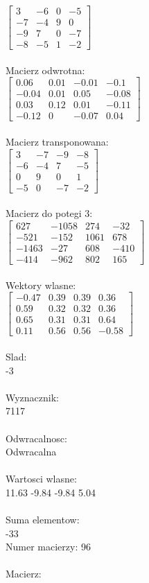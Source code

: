 \documentclass[a4paper,12pt]{article}
\begin{document}
$\begin{bmatrix} 3&-6&0&-5\\-7&-4&9&0\\-9&7&0&-7\\-8&-5&1&-2 \end{bmatrix}$
\\
\\
Macierz odwrotna:\\

$\begin{bmatrix} 0.06&0.01&-0.01&-0.1\\-0.04&0.01&0.05&-0.08\\0.03&0.12&0.01&-0.11\\-0.12&0&-0.07&0.04 \end{bmatrix}$
\\
\\
Macierz transponowana:\\

$\begin{bmatrix} 3&-7&-9&-8\\-6&-4&7&-5\\0&9&0&1\\-5&0&-7&-2 \end{bmatrix}$
\\
\\
Macierz do potegi 3:\\

$\begin{bmatrix} 627&-1058&274&-32\\-521&-152&1061&678\\-1463&-27&608&-410\\-414&-962&802&165 \end{bmatrix}$
\\
\\
Wektory wlasne:\\

$\begin{bmatrix} -0.47&0.39&0.39&0.36\\0.59&0.32&0.32&0.36\\0.65&0.31&0.31&0.64\\0.11&0.56&0.56&-0.58 \end{bmatrix}$
\\
\\
Slad:\\
-3
\\
\\
Wyznacznik:\\
7117
\\
\\
Odwracalnosc:\\
Odwracalna
\\
\\
Wartosci wlasne:\\
11.63 -9.84 -9.84 5.04
\\
\\
Suma elementow:\\
-33
\\
\newpage
Numer macierzy:
96
\\
\\
Macierz:\\
\end{document}
